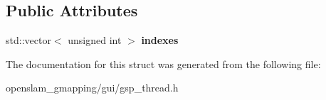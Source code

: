 \subsection*{Public Attributes}
\begin{DoxyCompactItemize}
\item 
\mbox{\label{structGridSlamProcessorThread_1_1ResampleEvent_a29869884c393ea1058db179a176e33c0}} 
std\+::vector$<$ unsigned int $>$ {\bfseries indexes}
\end{DoxyCompactItemize}


The documentation for this struct was generated from the following file\+:\begin{DoxyCompactItemize}
\item 
openslam\+\_\+gmapping/gui/gsp\+\_\+thread.\+h\end{DoxyCompactItemize}
